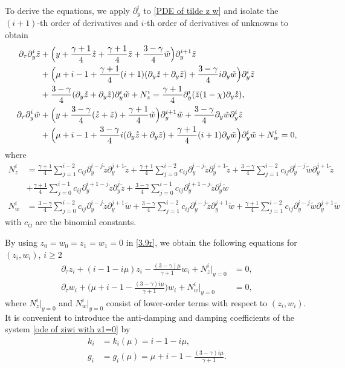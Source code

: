 \documentclass{article}
\newcommand{\ga}{\gamma}
\newcommand{\pa}{\partial}
\def\beqa{\begin{equation}\begin{aligned}}
\def\eeqa{\end{aligned}\end{equation}}
\numberwithin{equation}{section}
\begin{document}
To derive the equations, we apply $\pa_y^i$ to \eqref{PDE of tilde z w} and isolate the $(i+1)$-th order of derivatives and $i$-th order of derivatives of unknowns to obtain %
\begin{align}
    \pa_\tau \pa_y^i\tilde z &+ \Big(y+ \frac{\ga+1}{4} \mathring z+\frac{\ga+1}{4}\tilde z+ \frac{3-\ga}{4}\tilde w\Big) \pa_y^{i+1}\tilde z\notag \\
   & +\Big(\mu+i-1+\frac{\ga+1}{4}(i+1)(\pa_y\mathring z+ \pa_y\tilde z)+\frac{3-\ga}{4}i\pa_y\tilde w\Big)\pa_y^{i} \tilde z \label{3.9r} \\
   & +\frac{3-\ga}{4} (\pa_y \mathring z+\pa_y \tilde z) \pa_y^i \tilde w 
    + N_z^i
    =\frac{\ga+1}{4} \pa_y^i(\bar z (1-\chi)\pa_y\mathring z) , \notag \\
    \pa_\tau \pa_y^i \tilde w& + \Big(y+\frac{3-\ga}{4}(\mathring z+\tilde z)+\frac{\ga+1}{4}\tilde w \Big) \partial_y^{i+1} \tilde w+\frac{3-\ga}{4}  \pa_y \tilde w \pa_y^i \tilde z\notag \\
   & +\Big(\mu+i-1+\frac{3-\ga}{4}i(\pa_y\mathring z+\pa_y\tilde z)+\frac{\ga+1}{4}(i+1)\pa_y\tilde w  \Big) \partial_y^{i} \tilde w 
    +N_w^i =0, \notag 
\end{align}
where 
\beqa\label{NzNw}
    N_z^i&=\frac{\ga+1}{4}\sum_{j=1}^{i-2}c_{ij} \pa_y^{i-j}\tilde z \pa_y^{j+1}\tilde z+\frac{\ga+1}{4}\sum_{j=0}^{i-2}c_{ij} \pa_y^{i-j}\mathring z \pa_y^{j+1}\tilde z + \frac{3-\ga}{4}\sum_{j=1}^{i-2}c_{ij} \pa_y^{i-j}\tilde w \pa_y^{j+1}\tilde z\\
    &+\frac{\ga+1}{4}\sum_{j=0}^{i-1}c_{ij}\pa_y^{i+1-j}\mathring z \pa_y^{j}\tilde z+\frac{3-\ga}{4}\sum_{j=0}^{i-1}c_{ij}\pa_y^{i+1-j}\mathring z \pa_y^j \tilde w \\
    N_w^i&=\frac{3-\ga}{4}\sum_{j=0}^{i-2}c_{ij}\pa_y^{i-j}\mathring z \pa_y^{j+1} \tilde w + \frac{3-\ga}{4}\sum_{j=1}^{i-2}c_{ij} \pa_y^{i-j}\tilde z \pa_y^{j+1}\tilde w + \frac{\ga+1}{4}\sum_{j=1}^{i-2}c_{ij} \pa_y^{i-j}\tilde w \pa_y^{j+1}\tilde w
\eeqa
with $c_{ij}$ are the binomial constants.




By using $z_0=w_0=z_1=w_1=0$ in \eqref{3.9r}, we obtain the following equations for  $(z_i,w_i)$, $i\ge 2$
\beqa\label{ode of ziwi with z1=0}
    \pa_\tau z_i + (i-1-i\mu)z_i-\frac{(3-\ga)\mu}{\ga+1} w_i  
    +N_z^i|_{y=0}&=0,\\
    \pa_\tau w_i + \Big(\mu+i-1-\frac{(3-\ga)i\mu}{\ga+1} \Big) w_i+ N_w^i|_{y=0} &=0, 
\eeqa
where $N_z^i|_{y=0}$ and $N_w^i|_{y=0}$ consist of lower-order terms with respect to $(z_i,w_i)$.  
It is convenient to introduce the anti-damping and damping  coefficients of the system \eqref{ode of ziwi with z1=0} by 
 \beqa\label{g_i,k_i}
 k_i &= k_i(\mu) = i-1-i\mu, \\
    g_i &= g_i(\mu) =  \mu+i-1-\frac{(3-\ga)i\mu}{\ga+1}. 
    \eeqa
\end{document}
